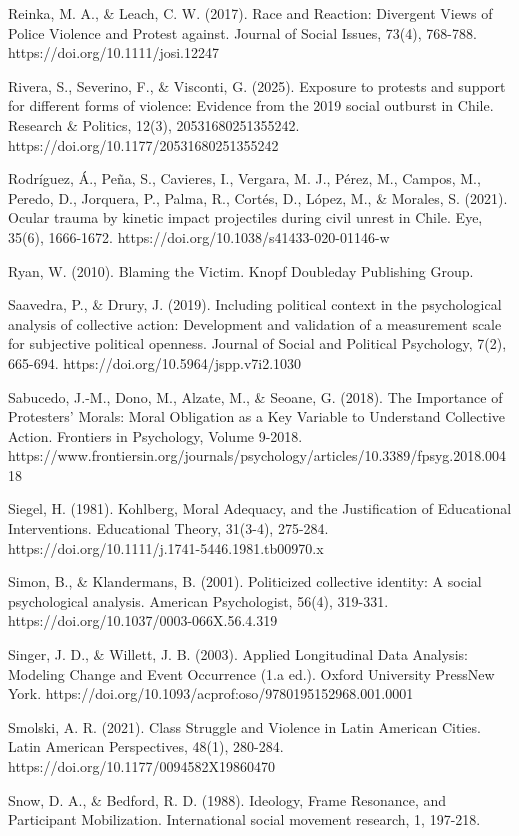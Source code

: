 \documentclass[
  13pt,
]{article}
\begin{document}
Reinka, M. A., \& Leach, C. W. (2017). Race and Reaction: Divergent
Views of Police Violence and Protest against. Journal of Social Issues,
73(4), 768-788. https://doi.org/10.1111/josi.12247

Rivera, S., Severino, F., \& Visconti, G. (2025). Exposure to protests
and support for different forms of violence: Evidence from the 2019
social outburst in Chile. Research \& Politics, 12(3),
20531680251355242. https://doi.org/10.1177/20531680251355242

Rodríguez, Á., Peña, S., Cavieres, I., Vergara, M. J., Pérez, M.,
Campos, M., Peredo, D., Jorquera, P., Palma, R., Cortés, D., López, M.,
\& Morales, S. (2021). Ocular trauma by kinetic impact projectiles
during civil unrest in Chile. Eye, 35(6), 1666-1672.
https://doi.org/10.1038/s41433-020-01146-w

Ryan, W. (2010). Blaming the Victim. Knopf Doubleday Publishing Group.

Saavedra, P., \& Drury, J. (2019). Including political context in the
psychological analysis of collective action: Development and validation
of a measurement scale for subjective political openness. Journal of
Social and Political Psychology, 7(2), 665-694.
https://doi.org/10.5964/jspp.v7i2.1030

Sabucedo, J.-M., Dono, M., Alzate, M., \& Seoane, G. (2018). The
Importance of Protesters' Morals: Moral Obligation as a Key Variable to
Understand Collective Action. Frontiers in Psychology, Volume 9-2018.
https://www.frontiersin.org/journals/psychology/articles/10.3389/fpsyg.2018.00418

Siegel, H. (1981). Kohlberg, Moral Adequacy, and the Justification of
Educational Interventions. Educational Theory, 31(3-4), 275-284.
https://doi.org/10.1111/j.1741-5446.1981.tb00970.x

Simon, B., \& Klandermans, B. (2001). Politicized collective identity: A
social psychological analysis. American Psychologist, 56(4), 319-331.
https://doi.org/10.1037/0003-066X.56.4.319

Singer, J. D., \& Willett, J. B. (2003). Applied Longitudinal Data
Analysis: Modeling Change and Event Occurrence (1.a ed.). Oxford
University PressNew York.
https://doi.org/10.1093/acprof:oso/9780195152968.001.0001

Smolski, A. R. (2021). Class Struggle and Violence in Latin American
Cities. Latin American Perspectives, 48(1), 280-284.
https://doi.org/10.1177/0094582X19860470

Snow, D. A., \& Bedford, R. D. (1988). Ideology, Frame Resonance, and
Participant Mobilization. International social movement research, 1,
197-218.
\end{document}
